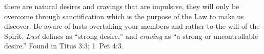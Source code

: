 there are natural desires and cravings that are impulsive, they will only be overcome through sanctification which is the purpose of the Law to make us discover. Be aware of lusts overtaking your members and rather to the will of the Spirit. \emph{Lust} defines as ``strong desire,'' and \emph{craving} as ``a strong or uncontrollable desire.''
Found in Titus 3:3; 1~Pet 4:3.
